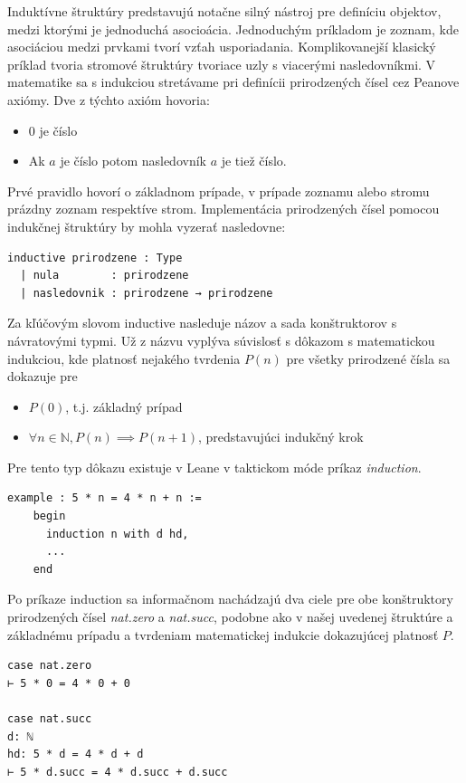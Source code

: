 \documentclass[a4paper,10pt,oneside]{report}%
\begin{document}
    Induktívne štruktúry predstavujú notačne silný nástroj pre definíciu objektov,
medzi ktorými je jednoduchá asocioácia.
    Jednoduchým príkladom je zoznam, kde asociáciou medzi prvkami tvorí vzťah
usporiadania.
    Komplikovanejší klasický príklad tvoria stromové štruktúry tvoriace uzly
s viacerými nasledovníkmi.
    V matematike sa s indukciou stretávame pri definícii prirodzených čísel
cez Peanove axiómy.
    Dve z týchto axióm hovoria:
\begin{itemize}
    \item 0 je číslo
    \item Ak $a$ je číslo potom nasledovník $a$ je tiež číslo.
\end{itemize}
    Prvé pravidlo hovorí o základnom prípade, v prípade zoznamu alebo stromu prázdny
zoznam respektíve strom.
    Implementácia prirodzených čísel pomocou indukčnej štruktúry by mohla vyzerať
nasledovne:
\begin{lstlisting}
inductive prirodzene : Type
  | nula        : prirodzene
  | nasledovnik : prirodzene → prirodzene
\end{lstlisting}
    Za kľúčovým slovom inductive nasleduje názov a sada konštruktorov s návratovými
typmi.
    Už z názvu vyplýva súvislosť s dôkazom s matematickou indukciou, kde platnosť
nejakého tvrdenia $P(n)$ pre všetky prirodzené čísla sa dokazuje pre
\begin{itemize}
    \item $P(0)$, t.j. základný prípad
    \item $\forall n \in \mathbb{N}, P(n) \implies P(n+1)$, predstavujúci indukčný krok
\end{itemize}
    Pre tento typ dôkazu existuje v Leane v taktickom móde príkaz \emph{induction}.
\begin{lstlisting}
example : 5 * n = 4 * n + n :=
    begin
      induction n with d hd,
      ...
    end
\end{lstlisting}
    Po príkaze induction sa informačnom nachádzajú dva ciele pre obe konštruktory
prirodzených čísel \emph{nat.zero} a \emph{nat.succ}, podobne ako v našej uvedenej
štruktúre a základnému prípadu a tvrdeniam matematickej indukcie dokazujúcej platnosť
$P$.
\begin{lstlisting}
case nat.zero
⊢ 5 * 0 = 4 * 0 + 0

case nat.succ
d: ℕ
hd: 5 * d = 4 * d + d
⊢ 5 * d.succ = 4 * d.succ + d.succ
\end{lstlisting}
\end{document}
